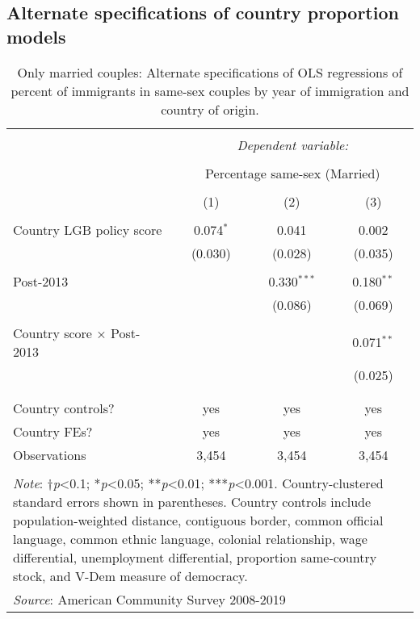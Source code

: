 \documentclass[
  11pt,
]{article}
\begin{document}
\newpage

\hypertarget{alternate-specifications-of-country-proportion-models}{%
\subsection{Alternate specifications of country proportion models}\label{alternate-specifications-of-country-proportion-models}}

\begin{table}[H] \centering 
  \caption{Only married couples: Alternate specifications of OLS regressions of percent of immigrants in same-sex couples by year of immigration and country of origin.} 
  \label{tab:country-props-alt} 
\begin{tabular}{@{\extracolsep{5pt}}lccc} 
\\[-1.8ex]\hline 
\hline \\[-1.8ex] 
 & \multicolumn{3}{c}{\textit{Dependent variable:}} \\ 
\cline{2-4} 
\\[-1.8ex] & \multicolumn{3}{c}{Percentage same-sex (Married)} \\ 
\\[-1.8ex] & (1) & (2) & (3)\\ 
\hline \\[-1.8ex] 
 Country LGB policy score & 0.074$^{*}$ & 0.041 & 0.002 \\ 
  & (0.030) & (0.028) & (0.035) \\ 
  & & & \\ 
 Post-2013 &  & 0.330$^{***}$ & 0.180$^{**}$ \\ 
  &  & (0.086) & (0.069) \\ 
  & & & \\ 
 Country score × Post-2013 &  &  & 0.071$^{**}$ \\ 
  &  &  & (0.025) \\ 
  & & & \\ 
\hline \\[-1.8ex] 
Country controls? & yes & yes & yes \\ 
Country FEs? & yes & yes & yes \\ 
Observations & 3,454 & 3,454 & 3,454 \\ 
\hline 
\hline \\[-1.8ex] 
\multicolumn{4}{l}{\parbox[t]{.7\textwidth}{\textit{Note}: †\textit{p}<0.1; *\textit{p}<0.05; **\textit{p}<0.01; ***\textit{p}<0.001. Country-clustered standard errors shown in parentheses. Country controls include population-weighted distance, contiguous border, common official language, common ethnic language, colonial relationship, wage differential, unemployment differential, proportion same-country stock, and V-Dem measure of democracy.}} \\ 
\multicolumn{4}{l}{\textit{Source}: American Community Survey 2008-2019} \\ 
\end{tabular} 
\end{table}
\end{document}
